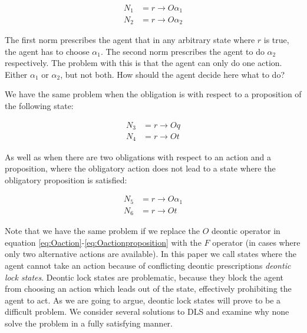 \begin{align}\label{eq:Oaction}
	N_1 &= r \rightarrow O \alpha_1\\
	N_2 &= r \rightarrow O \alpha_2 	
\end{align} 

The first norm prescribes the agent that in any arbitrary state where $r$ is true, the agent has to choose $\alpha_1$. The second norm prescribes the agent to do $\alpha_2$ respectively. The problem with this is that the agent can only do one action. Either $\alpha_1$ or $\alpha_2$, but not both. How should the agent decide here what to do? 

We have the same problem when the obligation is with respect to a proposition of the following state:

\begin{align}\label{eq:Oproposition}
	N_3 &= r \rightarrow O q\\
	N_4 &= r \rightarrow O t 	
\end{align} 

As well as when there are two obligations with respect to an action and a proposition, where the obligatory action does not lead to a state where the obligatory proposition is satisfied:

\begin{align}
	N_5 &= r \rightarrow O \alpha_1\\
	N_6 &= r \rightarrow O t \label{eq:Oactionproposition}
\end{align} 

Note that we have the same problem if we replace the $O$ deontic operator in equation \ref{eq:Oaction}-\ref{eq:Oactionproposition} with the $F$ operator (in cases where only two alternative actions are available). In this paper we call states where the agent cannot take an action because of conflicting deontic prescriptions \emph{deontic lock states}. Deontic lock states are problematic, because they block the agent from choosing an action which leads out of the state, effectively prohibiting the agent to act. As we are going to argue, deontic lock states will prove to be a difficult problem. We consider several solutions to DLS and examine why none solve the problem in a fully satisfying manner.